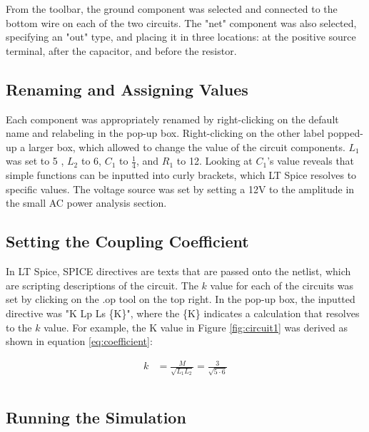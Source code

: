\documentclass[journal]{IEEEtran}
\begin{document}
\noindent From the toolbar, the ground component was selected and connected to the bottom wire on each of the two circuits. The "net" component was also selected, specifying an "out" type, and placing it in three locations: at the positive source terminal, after the capacitor, and before the resistor.

\subsection{Renaming and Assigning Values}

\noindent Each component was appropriately renamed by right-clicking on the default name and relabeling in the pop-up box. Right-clicking on the other label popped-up a larger box, which allowed to change the value of the circuit components. $L_1$ was set to 5 , $L_2$ to 6, $C_1$ to $\frac{1}{4}$, and $R_1$ to 12. Looking at $C_1$'s value reveals that simple functions can be inputted into curly brackets, which LT Spice resolves to specific values. The voltage source was set by setting a 12V to the amplitude in the small AC power analysis section. 

\subsection{Setting the Coupling Coefficient}

\noindent In LT Spice, SPICE directives are texts that are passed onto the netlist, which are scripting descriptions of the circuit. The $k$ value for each of the circuits was set by clicking on the .op tool on the top right. In the pop-up box, the inputted directive was "K Lp Ls \{K\}", where the \{K\} indicates a calculation that resolves to the $k$ value. For example, the K value in Figure \ref{fig:circuit1} was derived as shown in equation \ref{eq:coefficient}:

\begin{equation}
    \begin{split}
        k & = \frac{M}{\sqrt{L_1L_2}} = \frac{3}{\sqrt{5\cdot6}}\\ \\
    \end{split}
    \label{eq:coefficient}
\end{equation}

\subsection{Running the Simulation}\\
\end{document}
